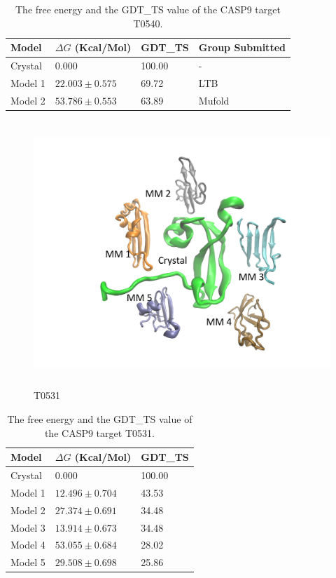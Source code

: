 \documentclass[12pt]{article}
\begin{document}
\begin{table}
\caption{The free energy and the GDT\_TS value of the CASP9 target T0540.}
\label{tab:T0540}
\begin{center}
\begin{tabular}{l l l l}\hline
Model   &     $\Delta G$ (Kcal/Mol) &  GDT\_TS & Group Submitted \\ \hline
Crystal &     0.000              &  100.00   & -      \\ 
Model 1 &     $22.003 \pm 0.575$ &  69.72    & LTB    \\
Model 2 &     $53.786 \pm 0.553$ &  63.89    & Mufold \\ \hline
\end{tabular}
\end{center}
\end{table}

\begin{figure}
\begin{center}
\includegraphics[width=12cm,height=10cm]{T0531.pdf}
\end{center}
\caption{T0531}
\label{fig:T0531}
\end{figure}

\begin{table}
\caption{The free energy and the GDT\_TS value of the CASP9 target T0531.}
\label{tab:T0531}
\begin{center}
\begin{tabular}{l l l}\hline
Model   &     $\Delta G$ (Kcal/Mol) &  GDT\_TS \\ \hline
Crystal &     0.000              & 100.00    \\
Model 1 &     $12.496 \pm 0.704$ &  43.53    \\
Model 2 &     $27.374 \pm 0.691$ &  34.48    \\
Model 3 &     $13.914 \pm 0.673$ &  34.48    \\
Model 4 &     $53.055 \pm 0.684$ &  28.02    \\
Model 5 &     $29.508 \pm 0.698$ &  25.86   \\ \hline
\end{tabular}
\end{center}
\end{table}
\end{document}
